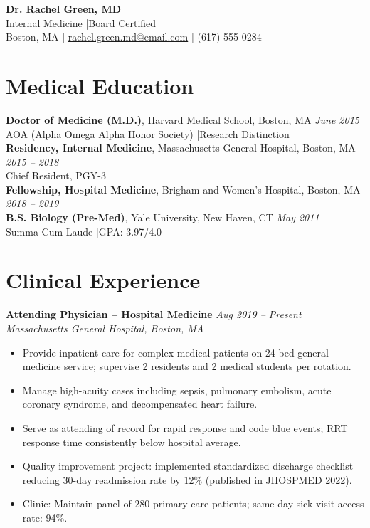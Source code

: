 \documentclass[11pt,a4paper]{article}
\begin{document}
\begin{center}
  {\LARGE \textbf{Dr. Rachel Green, MD}}\\[3pt]
  Internal Medicine \quad|\quad Board Certified\\[4pt]
  Boston, MA \quad|\quad
  \href{mailto:rachel.green.md@email.com}{rachel.green.md@email.com} \quad|\quad
  (617) 555-0284
\end{center}

\section{Medical Education}
\noindent\textbf{Doctor of Medicine (M.D.)}, Harvard Medical School, Boston, MA \hfill \textit{June 2015}\\
AOA (Alpha Omega Alpha Honor Society) \quad|\quad Research Distinction\\[3pt]
\noindent\textbf{Residency, Internal Medicine}, Massachusetts General Hospital, Boston, MA \hfill \textit{2015 -- 2018}\\
Chief Resident, PGY-3\\[3pt]
\noindent\textbf{Fellowship, Hospital Medicine}, Brigham and Women's Hospital, Boston, MA \hfill \textit{2018 -- 2019}\\[3pt]
\noindent\textbf{B.S. Biology (Pre-Med)}, Yale University, New Haven, CT \hfill \textit{May 2011}\\
Summa Cum Laude \quad|\quad GPA: 3.97/4.0

\section{Clinical Experience}

\noindent\textbf{Attending Physician -- Hospital Medicine} \hfill \textit{Aug 2019 -- Present}\\
\textit{Massachusetts General Hospital, Boston, MA}
\begin{itemize}
  \item Provide inpatient care for complex medical patients on 24-bed general medicine service; supervise 2 residents and 2 medical students per rotation.
  \item Manage high-acuity cases including sepsis, pulmonary embolism, acute coronary syndrome, and decompensated heart failure.
  \item Serve as attending of record for rapid response and code blue events; RRT response time consistently below hospital average.
  \item Quality improvement project: implemented standardized discharge checklist reducing 30-day readmission rate by 12\% (published in JHOSPMED 2022).
  \item Clinic: Maintain panel of 280 primary care patients; same-day sick visit access rate: 94\%.
\end{itemize}
\end{document}
